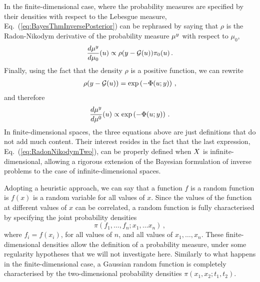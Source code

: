In the finite-dimensional case, where the probability measures are specified by
their densities with respect to the Lebesgue measure,
Eq.~(\ref{eq:BayesThmInversePosterior}) can be rephrased by saying  that $\rho$
is the Radon-Nikodym derivative of the probability measure $\mu^y$ with respect
to $\mu_0$, \viz
\begin{align}
  \label{eq:RadonNikodym}
  \frac{d\mu^y}{d\mu_0} (u) \propto \rho(y-\mathcal{G}(u)) \pi_0(u)\, .
\end{align}
Finally, using the fact that the density $\rho$ is a positive
function, we can rewrite 
\begin{align}
  \label{eq:PotentialDef}
  \rho(y-\mathcal{G}(u)) = \exp\left(-\Phi(u;y)\right)\, ,
\end{align}
and therefore
\begin{align}
  \label{eq:RadonNikodymTwo}
  \frac{d\mu^y}{d\mu^0} (u) \propto \exp\left(-\Phi(u;y)\right)\, .
\end{align}
In finite-dimensional spaces, the three equations above are just definitions
that do not add much content. Their interest resides in the fact that the last
expression, Eq.~(\ref{eq:RadonNikodymTwo}), can be properly defined when $X$ is
infinite-dimensional, allowing a rigorous extension of the Bayesian formulation
of inverse problems to the case of infinite-dimensional spaces. 

Adopting a heuristic approach, we can say that a function $f$ is a random
function is $f(x)$ is a random variable for all values of $x$. Since the values
of the function at different values of $x$ can be correlated, a random function
is fully characterised by specifying the joint probability densities
\begin{equation}
  \label{eq:RandomFuncJointProb}
  \pi\left(
    f_1, \ldots, f_n; x_1, \ldots x_n
  \right)\, ,
\end{equation}
where $f_i=f(x_i)$, for all values of $n$, and all values of $x_1, \ldots, x_n$.
These finite-dimensional densities allow the definition of a probability
measure, under some regularity hypotheses that we will not investigate here.
Similarly to what happens in the finite-dimensional case, a Gaussian random
function is completely characterised by the two-dimensional probability
densities $\pi(x_1,x_2;t_1,t_2)$.


